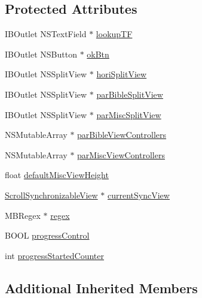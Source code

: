 \subsection*{Protected Attributes}
\begin{DoxyCompactItemize}
\item 
I\-B\-Outlet N\-S\-Text\-Field $\ast$ \hyperlink{interface_bible_combi_view_controller_a583dd334c6fc179350c0040dd6d33070}{lookup\-T\-F}
\item 
I\-B\-Outlet N\-S\-Button $\ast$ \hyperlink{interface_bible_combi_view_controller_a8103b2d13ca46275ee26611fe96a0d21}{ok\-Btn}
\item 
I\-B\-Outlet N\-S\-Split\-View $\ast$ \hyperlink{interface_bible_combi_view_controller_aacd4f740fd7ea228c8de2e2c128ccd41}{hori\-Split\-View}
\item 
I\-B\-Outlet N\-S\-Split\-View $\ast$ \hyperlink{interface_bible_combi_view_controller_a1156d980cfde59a1ffe0e868b3267486}{par\-Bible\-Split\-View}
\item 
I\-B\-Outlet N\-S\-Split\-View $\ast$ \hyperlink{interface_bible_combi_view_controller_a5386b943ad9220b8034ea6123214a0b6}{par\-Misc\-Split\-View}
\item 
N\-S\-Mutable\-Array $\ast$ \hyperlink{interface_bible_combi_view_controller_ab4a5dbd9191fa1b8c79b7e80e0d24450}{par\-Bible\-View\-Controllers}
\item 
N\-S\-Mutable\-Array $\ast$ \hyperlink{interface_bible_combi_view_controller_ac4b52409db6cec8114e7bf5616062458}{par\-Misc\-View\-Controllers}
\item 
float \hyperlink{interface_bible_combi_view_controller_ad58edad2ea97340760ca0da6cac87c0e}{default\-Misc\-View\-Height}
\item 
\hyperlink{interface_scroll_synchronizable_view}{Scroll\-Synchronizable\-View} $\ast$ \hyperlink{interface_bible_combi_view_controller_a8a40ec639d09979bb70eef65d0e37de2}{current\-Sync\-View}
\item 
M\-B\-Regex $\ast$ \hyperlink{interface_bible_combi_view_controller_aa81ab07ce626b36fec2864be2b760423}{regex}
\item 
B\-O\-O\-L \hyperlink{interface_bible_combi_view_controller_a520e9ef33fc5e1e0c1c2a647d1867e17}{progress\-Control}
\item 
int \hyperlink{interface_bible_combi_view_controller_a3be32f3227e9f29fca39bcdd786b789d}{progress\-Started\-Counter}
\end{DoxyCompactItemize}
\subsection*{Additional Inherited Members}


